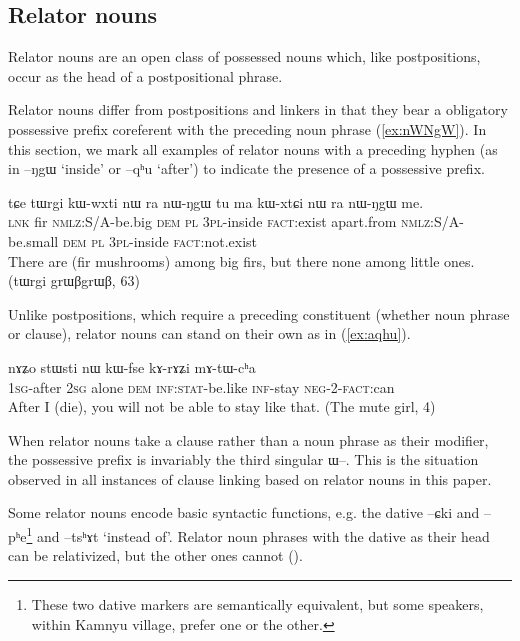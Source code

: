 \documentclass[oldfontcommands,oneside,a4paper,11pt]{article}
\newcommand{\ipa}[1]{{\phon \mbox{#1}}} %
\newcommand{\refb}[1]{(\ref{#1})}
\begin{document}
\subsection{Relator nouns} \label{sec:relator}
Relator nouns are an open class of possessed nouns which, like postpositions, occur as the head of a postpositional phrase. 

Relator nouns differ from postpositions and linkers in that they bear a obligatory possessive prefix coreferent with the preceding    noun phrase \refb{ex:nWNgW}. In this section, we mark all examples of relator nouns with a preceding hyphen (as in \ipa{--ŋgɯ} `inside' or \ipa{--qʰu} `after') to indicate the  presence of a possessive prefix.

 \begin{exe}
\ex \label{ex:nWNgW} 
\gll  
\ipa{tɕe}  	\ipa{tɯrgi}  	\ipa{kɯ-wxti}  	\ipa{nɯ} \ipa{ra}  	\ipa{nɯ-ŋgɯ}  	\ipa{tu}  	\ipa{ma}  	\ipa{kɯ-xtɕi}  	\ipa{nɯ} \ipa{ra}  	\ipa{nɯ-ŋgɯ}  	\ipa{me.}  \\
\textsc{lnk} fir \textsc{nmlz}:S/A-be.big \textsc{dem} \textsc{pl} \textsc{3pl}-inside \textsc{fact}:exist apart.from \textsc{nmlz:S/A}-be.small  \textsc{dem} \textsc{pl} \textsc{3pl}-inside  \textsc{fact}:not.exist \\
\glt There are (fir mushrooms) among big firs, but there none among little ones. (tɯrgi grɯβgrɯβ, 63)
\end{exe}


Unlike postpositions, which require a preceding constituent (whether noun phrase or clause), relator nouns can stand on their own as in \refb{ex:aqhu}.

 \begin{exe}
\ex \label{ex:aqhu} 
\gll  \ipa{a-qʰu}  	\ipa{nɤʑo}  	\ipa{stɯsti}  	\ipa{nɯ}  	\ipa{kɯ-fse}  	\ipa{kɤ-rɤʑi}  	\ipa{mɤ-tɯ-cʰa}  \\
\textsc{1sg}-after \textsc{2sg} alone \textsc{dem} \textsc{inf:stat}-be.like \textsc{inf}-stay \textsc{neg-2-fact}:can \\
\glt After I (die), you will not be able to stay like that. (The mute girl, 4)
\end{exe}

When relator nouns take a clause  rather than a noun phrase as their modifier, the possessive prefix is invariably the third singular \ipa{ɯ--}. This is the situation observed in all instances of clause linking based on relator nouns in this paper.



Some relator nouns encode basic syntactic functions, e.g. the dative \ipa{--ɕki} and \ipa{--pʰe}\footnote{These two dative markers are semantically equivalent, but some speakers, within Kamnyu village, prefer one or the other.} and \ipa{--tsʰɤt} `instead of'.   Relator noun phrases with the dative as their head can be relativized, but the other ones cannot (\citealt{jacques14relatives}).
\end{document}
